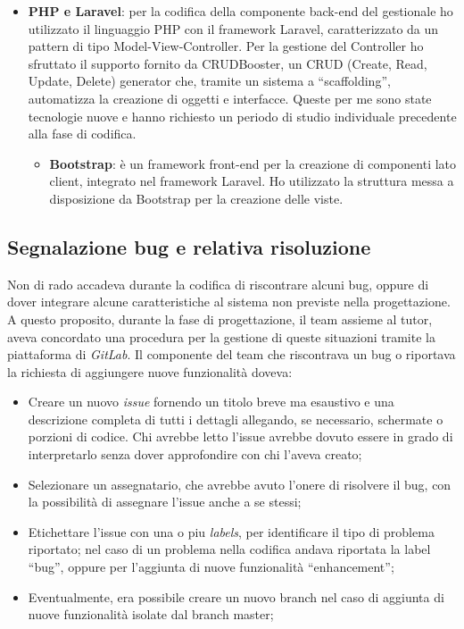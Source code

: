 \begin{itemize}
\item \textbf{PHP e Laravel}: per la codifica della componente back-end del gestionale ho utilizzato il linguaggio PHP con il framework Laravel, caratterizzato da un pattern di tipo Model-View-Controller. Per la gestione del Controller ho sfruttato il supporto fornito da CRUDBooster, un CRUD (Create, Read, Update, Delete) generator che, tramite un sistema a ``scaffolding'', automatizza la creazione di oggetti e interfacce. Queste per me sono state tecnologie nuove e hanno richiesto un periodo di studio individuale precedente alla fase di codifica.
	\begin{itemize}
		\item \textbf{Bootstrap}: è un framework front-end per la creazione di componenti lato client, integrato nel framework Laravel. Ho utilizzato la struttura messa a disposizione da Bootstrap per la creazione delle viste.
	\end{itemize}
\end{itemize}

\subsection{Segnalazione bug e relativa risoluzione}
Non di rado accadeva durante la codifica di riscontrare alcuni bug, oppure di dover integrare alcune caratteristiche al sistema non previste nella progettazione. A questo proposito, durante la fase di progettazione, il team assieme al tutor, aveva concordato una procedura per la gestione di queste situazioni tramite la piattaforma di \textit{GitLab}. Il componente del team che riscontrava un bug o riportava la richiesta di aggiungere nuove funzionalità doveva:
\begin{itemize}
\item Creare un nuovo \textit{issue} fornendo un titolo breve ma esaustivo e una descrizione completa di tutti i dettagli allegando, se necessario, schermate o porzioni di codice. Chi avrebbe letto l'issue avrebbe dovuto essere in grado di interpretarlo senza dover approfondire con chi l'aveva creato;
\item Selezionare un assegnatario, che avrebbe avuto l'onere di risolvere il bug, con la possibilità di assegnare l'issue anche a se stessi;
\item Etichettare l'issue con una o piu \textit{labels}, per identificare il tipo di problema riportato; nel caso di un problema nella codifica andava riportata la label ``bug'', oppure per l'aggiunta di nuove funzionalità ``enhancement'';
\item Eventualmente, era possibile creare un nuovo branch nel caso di aggiunta di nuove funzionalità isolate dal branch master;
\end{itemize}

